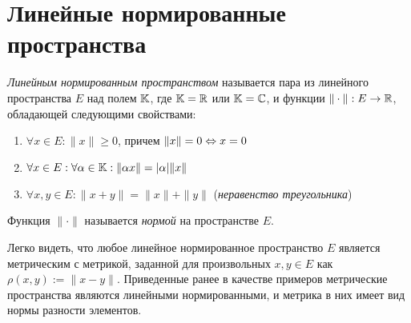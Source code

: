 \section{Линейные нормированные пространства}

\begin{definition}
	\textit{Линейным нормированным пространством} называется пара из линейного пространства $E$ над полем $\mathbb{K}$, где $\mathbb{K} = \mathbb{R}$ или $\mathbb{K} = \mathbb{C}$, и функции $\|\cdot\| : E \to \mathbb{R}$, обладающей следующими свойствами:
	\begin{enumerate}
		\item $\forall x \in E: \|x\| \ge 0$, причем $\|x\| = 0 \Leftrightarrow x = 0$
		\item $\forall x \in E: \forall \alpha \in \mathbb{K}: \|\alpha x\| = |\alpha|\|x\|$
		\item $\forall x, y \in E: \|x + y\| = \|x\| + \|y\|$ (\textit{неравенство треугольника})
	\end{enumerate}

	Функция $\|\cdot\|$ называется \textit{нормой} на пространстве $E$.
\end{definition}

\begin{example}
    Легко видеть, что любое линейное нормированное пространство $E$ является метрическим с метрикой, заданной для произвольных $x, y \in E$ как $\rho(x, y) := \|x - y\|$. Приведенные ранее в качестве примеров метрические пространства являются линейными нормированными, и метрика в них имеет вид нормы разности элементов.
\end{example}


